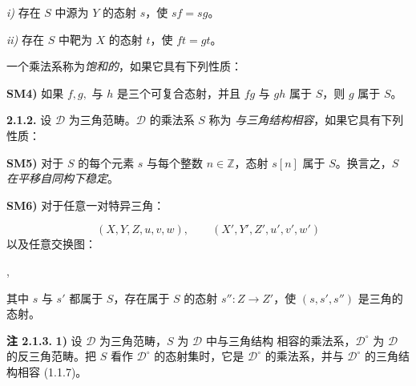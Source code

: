 
\clearpage
{}%
\begingroup
\small
\setlength{\emergencystretch}{1.5em}%
\setlength{\abovedisplayskip}{3pt plus 2pt minus 2pt}%
\setlength{\belowdisplayskip}{3pt plus 2pt minus 2pt}%

\noindent\textit{i)} 存在 $S$ 中源为 $Y$ 的态射 $s$，使 $sf=sg$。

\noindent\textit{ii)} 存在 $S$ 中靶为 $X$ 的态射 $t$，使 $ft=gt$。

\noindent 一个乘法系称为\emph{饱和的}，如果它具有下列性质：

\smallskip
\noindent\textbf{SM4)} 如果 $f,g,$ 与 $h$ 是三个可复合态射，并且 $fg$ 与 $gh$
属于 $S$，则 $g$ 属于 $S$。

\medskip
\noindent\textbf{2.1.2.}\quad
{}
设 $\mathcal D$ 为三角范畴。$\mathcal D$ 的乘法系 $S$ 称为
\emph{与三角结构相容}，如果它具有下列性质：

\smallskip
\noindent\textbf{SM5)} 对于 $S$ 的每个元素 $s$ 与每个整数
$n\in\mathbb Z$，态射 $s[n]$ 属于 $S$。换言之，$S$
\emph{在平移自同构下稳定}。

\smallskip
\noindent\textbf{SM6)} 对于任意一对特异三角：

\[
  (X,Y,Z,u,v,w), \qquad (X',Y',Z',u',v',w')
\]
\noindent 以及任意交换图：

\begin{center}
  \quad ,
\end{center}
\noindent 其中 $s$ 与 $s'$ 都属于 $S$，存在属于 $S$ 的态射
$s''\colon Z\to Z'$，使 $(s,s',s'')$ 是三角的态射。

\medskip
\noindent\textbf{注 2.1.3.}\quad
{}
\textbf{1)} 设 $\mathcal D$ 为三角范畴，$S$ 为 $\mathcal D$ 中与三角结构
相容的乘法系，$\mathcal D^\circ$ 为 $\mathcal D$ 的反三角范畴。把 $S$ 看作
$\mathcal D^\circ$ 的态射集时，它是 $\mathcal D^\circ$ 的乘法系，并与
$\mathcal D^\circ$ 的三角结构相容 (1.1.7)。

